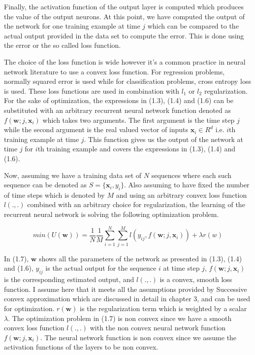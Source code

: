 Finally, the activation function of the output layer is computed which produces the value of the output neurons. At this point, we have computed the output of the network for one training example at time $j$ which can be compared to the actual output provided in the data set to compute the error. This is done using the error or the so called loss function. 

The choice of the loss function is wide however it's a common practice in neural network literature to use a convex loss function. For regression problems, normally squared error is used while for classification problems, cross entropy loss is used. These loss functions are used in combination with $l_1$ or $l_2$ regularization. For the sake of optimization, the expressions in (1.3), (1.4) and (1.6) can be substituted with an arbitrary recurrent neural network function denoted as $f(\textbf{w};j,\textbf{x}_i)$  which takes two arguments. The first argument is the time step $j$ while the second argument is the real valued vector of inputs $\textbf{x}_i\in R^{d}$ i.e. $i$th training example at time $j$. This function gives us the output of the network at time $j$ for $i$th training example and covers the expressions in (1.3), (1.4) and (1.6).   

Now, assuming we have a training data set of $N$ sequences where each such sequence can be denoted as 
$S=\lbrace \textbf{x}_i,y_i \rbrace$. Also assuming to have fixed the number of time steps which is denoted by $M$ and using an arbitrary convex loss function $l(.,.)$ combined with an arbitrary choice for regularization, the learning of the recurrent neural network is solving the following optimization problem.

\begin{equation}
min ( U(\textbf{w}) ) = \frac{1}{N} \frac{1}{M} \sum_{i=1}^{N} \sum_{j=1}^{M} l(y_{ij},f(\textbf{w};j,\textbf{x}_i))+\lambda r(w)
\end{equation}
 
In (1.7), $\textbf{w}$ shows all the parameters of the network as presented in (1.3), (1.4) and (1.6), $y_{ij}$ is the actual output for the sequence $i$ at time step $j$, $f(\textbf{w};j,\textbf{x}_i)$ is the corresponding estimated output, and $l(.,.)$ is a convex, smooth loss function. I assume here that it meets all the assumptions provided by Successive convex approximation which are discussed in detail in chapter 3, and can be used for optimization. $r(\textbf{w})$ is the regularization term which is weighted by a scalar $\lambda$. The optimization problem in (1.7) is non convex since we have a smooth convex loss function $l(.,.)$ with the non convex neural network function $f(\textbf{w};j,\textbf{x}_i)$. The neural network function is non convex since we assume the activation functions of the layers to be non convex.  
   
